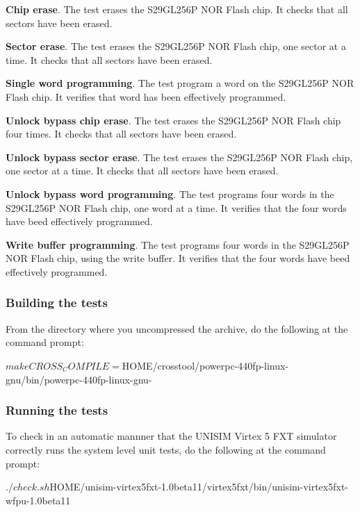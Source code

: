 \noindent \textbf{Chip erase}. The test erases the S29GL256P NOR Flash chip.
It checks that all sectors have been erased.

\noindent \textbf{Sector erase}. The test erases the S29GL256P NOR Flash chip, one sector at a time.
It checks that all sectors have been erased.

\noindent \textbf{Single word programming}. The test program a word on the S29GL256P NOR Flash chip.
It verifies that word has been effectively programmed.

\noindent \textbf{Unlock bypass chip erase}. The test erases the S29GL256P NOR Flash chip four times.
It checks that all sectors have been erased.

\noindent \textbf{Unlock bypass sector erase}. The test erases the S29GL256P NOR Flash chip, one sector at a time.
It checks that all sectors have been erased.

\noindent \textbf{Unlock bypass word programming}. The test programs four words in the S29GL256P NOR Flash chip, one word at a time.
It verifies that the four words have beed effectively programmed.

\noindent \textbf{Write buffer programming}. The test programs four words in the S29GL256P NOR Flash chip, using the write buffer.
It verifies that the four words have beed effectively programmed.

\subsubsection{Building the tests}

From the directory where you uncompressed the archive, do the following at the command prompt:
\begin{script}
   $ make CROSS_COMPILE=${HOME}/crosstool/powerpc-440fp-linux-gnu/bin/powerpc-440fp-linux-gnu-
\end{script}

\subsubsection{Running the tests}

\noindent To check in an automatic mannner that the UNISIM Virtex 5 FXT simulator correctly runs the system level unit tests, do the following at the command prompt:
\begin{script}
   $ ./check.sh ${HOME}/unisim-virtex5fxt-1.0beta11/virtex5fxt/bin/unisim-virtex5fxt-wfpu-1.0beta11
\end{script}

